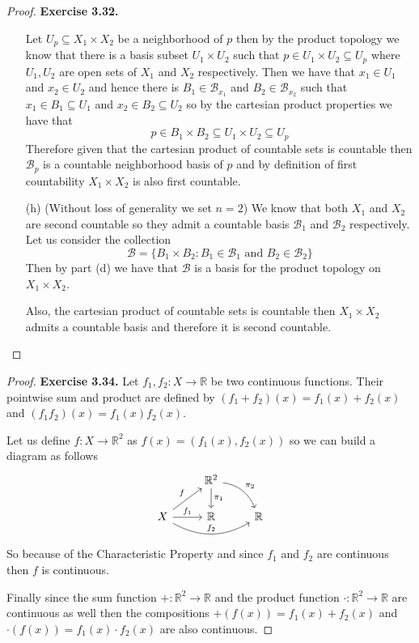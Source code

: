 \documentclass[11pt]{article}
\newcommand{\R}{\mathbb{R}}
\theoremstyle{definition}
\begin{document}
\begin{proof}{\textbf{Exercise 3.32.}}
\begin{itemize}
    Let $U_p \subseteq X_1 \times X_2$ be a neighborhood of $p$ then by the product
    topology we know that there is a basis subset $U_1 \times U_2$
    such that $p \in U_1 \times U_2 \subseteq U_p$
    where $U_1, U_2$ are open sets of $X_1$ and $X_2$ respectively.
    Then we have that $x_1 \in U_1$ and $x_2 \in U_2$ and hence there is
    $B_1 \in \mathcal{B}_{x_1}$ and $B_2 \in \mathcal{B}_{x_2}$ such that
    $x_1 \in B_1 \subseteq U_1$ and $x_2 \in B_2 \subseteq U_2$
    so by the cartesian product properties we have that
    $$p \in B_1 \times B_2 \subseteq U_1 \times U_2 \subseteq U_p$$
    Therefore given that the cartesian product of countable sets is countable
    then $\mathcal{B}_p$ is a countable neighborhood basis of $p$
    and by definition of first countability $X_1 \times X_2$
    is also first countable.
\cleardoublepage
    \item [(h)] (Without loss of generality we set $n=2$)
    We know that both $X_1$ and $X_2$ are second countable so they admit
    a countable basis $\mathcal{B}_1$ and $\mathcal{B}_2$ respectively.
    Let us consider the collection
    $$\mathcal{B} = \{B_1\times B_2 :
    B_1 \in \mathcal{B}_1 \text{ and }B_2 \in \mathcal{B}_2\}$$
    Then by part (d) we have that $\mathcal{B}$ is a basis for
    the product topology on $X_1 \times X_2$.

    Also, the cartesian product of countable sets is countable
    then $X_1 \times X_2$ admits a countable basis and therefore
    it is second countable.
\end{itemize}
\end{proof}
\begin{proof}{\textbf{Exercise 3.34.}}
    Let $f_1, f_2: X \to \R$ be two continuous functions. Their pointwise sum
    and product are defined by $(f_1 + f_2)(x) = f_1(x) + f_2(x)$
    and $(f_1f_2)(x) = f_1(x) f_2(x)$.

    Let us define $f: X \to \R^2$ as $f(x) = (f_1(x), f_2(x))$ so we can build
    a diagram as follows
    \[\begin{tikzcd}
        & \R^2 \arrow[d,"\pi_1"] \arrow[dr, bend left,"\pi_2"] & \\
        X \arrow[ur,"f"]\arrow[r,"f_1"]\arrow[rr, bend right, "f_2"] & \R &  \R
    \end{tikzcd}\]
    So because of the Characteristic Property and since $f_1$ and $f_2$
    are continuous then $f$ is continuous.

    Finally since the sum function $+: \R^2 \to \R$ and
    the product function $\cdot: \R^2 \to \R$ are continuous
    as well then the compositions $+(f(x)) = f_1(x) + f_2(x)$ and
    $\cdot(f(x)) = f_1(x)\cdot f_2(x)$ are also continuous.
\end{proof}
\end{document}
